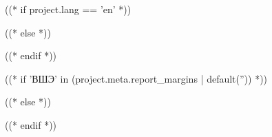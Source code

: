 %
\newcommand{\hseDefaultMono}{Consolas}


((* if project.lang == 'en' *))
\usepackage[russian,english]{babel}
\addto\captionsenglish{\renewcommand{\bibname}{References}}
((* else *))
\usepackage[english,russian]{babel}
\addto\captionsrussian{\renewcommand{\bibname}{Список использованных источников}}
((* endif *))


((* if 'ВШЭ' in (project.meta.report_margins | default('')) *))
\usepackage[a4paper,left=25mm,right=10mm,top=20mm,bottom=20mm]{geometry}
((* else *))
\usepackage[a4paper,left=30mm,right=15mm,top=20mm,bottom=20mm]{geometry}
((* endif *))
\usepackage{setspace}
\onehalfspacing
\usepackage{indentfirst}
\setlength{\parindent}{1.25cm}
\setlength{\parskip}{6pt}

\usepackage{microtype}
\usepackage{fvextra}
\usepackage{csquotes}
\usepackage{amsmath}
\usepackage{amssymb}
\usepackage{etoolbox}
\usepackage{graphicx}
\usepackage{letltxmacro}
\renewcommand{\includegraphics}[2][]{%
  \IfFileExists{#2}{%
    \oldincludegraphics[#1]{#2}%
  }{%
    \IfFileExists{#2.png}{\oldincludegraphics[#1]{#2.png}}{%
      \IfFileExists{#2.jpg}{\oldincludegraphics[#1]{#2.jpg}}{%
        \fcolorbox{red}{white}{%
          \begin{minipage}{0.5\textwidth}\centering
            \textcolor{red}{\textbf{Файл не найден:}} \\ \texttt{\detokenize{#2}}
          \end{minipage}%
        }%
      }%
    }%
  }%
}
\usepackage{xcolor}
\usepackage{hyperref}
\usepackage{lastpage}
\usepackage{float}
\usepackage{array}
\usepackage{booktabs}
\usepackage{longtable}
\usepackage{tabularx}
\usepackage{adjustbox}
\usepackage{xurl}
\usepackage{hyphenat}
\usepackage{caption}
\usepackage{cite}
\captionsetup[table]{position=top,labelsep=emdash,justification=raggedright,singlelinecheck=false}
\captionsetup[figure]{position=bottom,labelsep=emdash}

